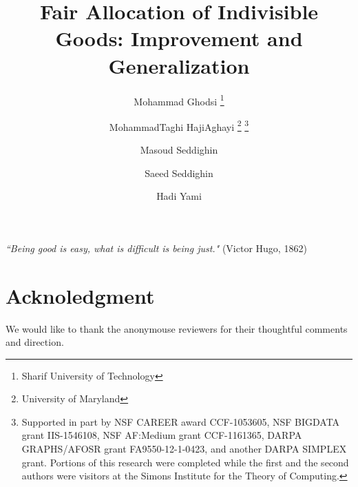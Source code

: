 \documentclass[letterpaper,11pt]{article}
\title{Fair Allocation of Indivisible Goods: Improvement and Generalization
}
\author{
	Mohammad Ghodsi \thanks{Sharif University of Technology} 
	\and MohammadTaghi HajiAghayi \thanks{University of Maryland}
	\thanks{Supported in part by NSF CAREER award CCF-1053605,  NSF BIGDATA grant IIS-1546108, NSF AF:Medium grant CCF-1161365, DARPA GRAPHS/AFOSR grant FA9550-12-1-0423, and another DARPA SIMPLEX grant.
		Portions of this research were completed while the first and the second authors were visitors at the Simons Institute for the Theory of Computing.}
	\and Masoud Seddighin \samethanks[1]
	\and Saeed Seddighin \samethanks[2] \samethanks[3]
	\and Hadi Yami \samethanks[2] \samethanks[3]
}
\begin{document}
	\newcommand{\ignore}[1]{}
\renewcommand{\theenumi}{(\roman{enumi}).}
\renewcommand{\labelenumi}{\theenumi}
\sloppy

% 
% 

\date{}

\maketitle
\textit{``Being good is easy, what is difficult is being just."} \cite{hugo2000miserables} (Victor Hugo, 1862)

\thispagestyle{empty}


\begin{abstract}

\end{abstract}






\section{Acknoledgment}
We would like to thank the anonymouse reviewers for their thoughtful comments and direction.
%
%
%

	
%	
%	
	

	

\newpage

\appendix


	 



\end{document}
